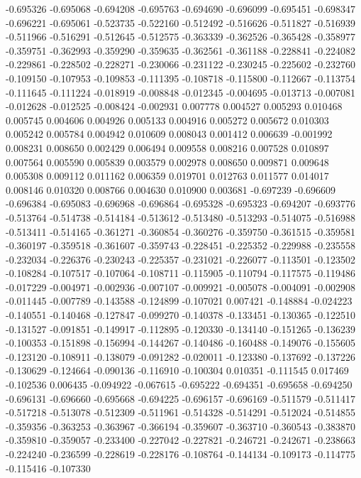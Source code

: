 -0.695326
-0.695068
-0.694208
-0.695763
-0.694690
-0.696099
-0.695451
-0.698347
-0.696221
-0.695061
-0.523735
-0.522160
-0.512492
-0.516626
-0.511827
-0.516939
-0.511966
-0.516291
-0.512645
-0.512575
-0.363339
-0.362526
-0.365428
-0.358977
-0.359751
-0.362993
-0.359290
-0.359635
-0.362561
-0.361188
-0.228841
-0.224082
-0.229861
-0.228502
-0.228271
-0.230066
-0.231122
-0.230245
-0.225602
-0.232760
-0.109150
-0.107953
-0.109853
-0.111395
-0.108718
-0.115800
-0.112667
-0.113754
-0.111645
-0.111224
-0.018919
-0.008848
-0.012345
-0.004695
-0.013713
-0.007081
-0.012628
-0.012525
-0.008424
-0.002931
0.007778
0.004527
0.005293
0.010468
0.005745
0.004606
0.004926
0.005133
0.004916
0.005272
0.005672
0.010303
0.005242
0.005784
0.004942
0.010609
0.008043
0.001412
0.006639
-0.001992
0.008231
0.008650
0.002429
0.006494
0.009558
0.008216
0.007528
0.010897
0.007564
0.005590
0.005839
0.003579
0.002978
0.008650
0.009871
0.009648
0.005308
0.009112
0.011162
0.006359
0.019701
0.012763
0.011577
0.014017
0.008146
0.010320
0.008766
0.004630
0.010900
0.003681
-0.697239
-0.696609
-0.696384
-0.695083
-0.696968
-0.696864
-0.695328
-0.695323
-0.694207
-0.693776
-0.513764
-0.514738
-0.514184
-0.513612
-0.513480
-0.513293
-0.514075
-0.516988
-0.513411
-0.514165
-0.361271
-0.360854
-0.360276
-0.359750
-0.361515
-0.359581
-0.360197
-0.359518
-0.361607
-0.359743
-0.228451
-0.225352
-0.229988
-0.235558
-0.232034
-0.226376
-0.230243
-0.225357
-0.231021
-0.226077
-0.113501
-0.123502
-0.108284
-0.107517
-0.107064
-0.108711
-0.115905
-0.110794
-0.117575
-0.119486
-0.017229
-0.004971
-0.002936
-0.007107
-0.009921
-0.005078
-0.004091
-0.002908
-0.011445
-0.007789
-0.143588
-0.124899
-0.107021
0.007421
-0.148884
-0.024223
-0.140551
-0.140468
-0.127847
-0.099270
-0.140378
-0.133451
-0.130365
-0.122510
-0.131527
-0.091851
-0.149917
-0.112895
-0.120330
-0.134140
-0.151265
-0.136239
-0.100353
-0.151898
-0.156994
-0.144267
-0.140486
-0.160488
-0.149076
-0.155605
-0.123120
-0.108911
-0.138079
-0.091282
-0.020011
-0.123380
-0.137692
-0.137226
-0.130629
-0.124664
-0.090136
-0.116910
-0.100304
0.010351
-0.111545
0.017469
-0.102536
0.006435
-0.094922
-0.067615
-0.695222
-0.694351
-0.695658
-0.694250
-0.696131
-0.696660
-0.695668
-0.694225
-0.696157
-0.696169
-0.511579
-0.511417
-0.517218
-0.513078
-0.512309
-0.511961
-0.514328
-0.514291
-0.512024
-0.514855
-0.359356
-0.363253
-0.363967
-0.366194
-0.359607
-0.363710
-0.360543
-0.383870
-0.359810
-0.359057
-0.233400
-0.227042
-0.227821
-0.246721
-0.242671
-0.238663
-0.224240
-0.236599
-0.228619
-0.228176
-0.108764
-0.144134
-0.109173
-0.114775
-0.115416
-0.107330
